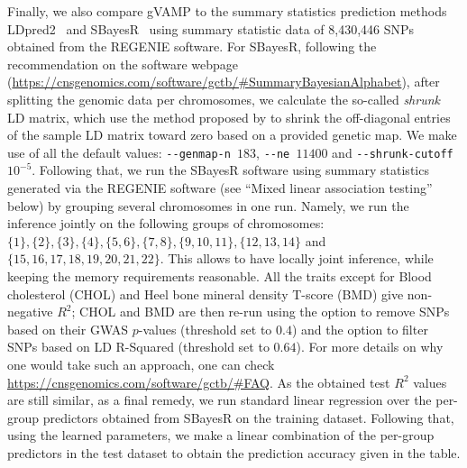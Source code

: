 Finally, we also compare gVAMP to the summary statistics prediction methods LDpred2~\cite{ldpred} and SBayesR~\cite{sbayesr} using summary statistic data of 8,430,446 SNPs obtained from the REGENIE software. For SBayesR, following the recommendation on the software webpage (\url{https://cnsgenomics.com/software/gctb/#SummaryBayesianAlphabet}), after splitting the genomic data per chromosomes, we calculate the so-called \textit{shrunk} LD matrix, which use the method proposed by \cite{Wen_Stephens} to shrink the off-diagonal entries of the sample LD matrix toward zero based on a provided genetic map. We make use of all the default values: \texttt{-{}-genmap-n $183$}, \texttt{-{}-ne $11400$} and \texttt{-{}-shrunk-cutoff $10^{-5}$}. Following that, we run the SBayesR software using summary statistics generated via the REGENIE software (see ``Mixed linear association testing'' below) by grouping several chromosomes in one run. Namely, we run the inference jointly on the following groups of chromosomes: $\{1\}, \{2\}, \{3\}, \{4\}, \allowbreak \{5,6\}, \allowbreak \{7,8\}, \allowbreak \{9, 10, 11\}, \allowbreak \{12, 13, 14\}$ and $\{15, 16, 17, 18, 19, 20, 21, 22\}$. This allows to have locally joint inference, while keeping the memory requirements reasonable. All the traits except for Blood cholesterol (CHOL) and Heel bone mineral density T-score (BMD) give non-negative $R^2$; CHOL and BMD are then re-run using the option to remove SNPs based on their GWAS $p$-values (threshold set to $0.4$) and the option to filter SNPs based on LD R-Squared (threshold set to $0.64$). For more details on why one would take such an approach, one can check \url{https://cnsgenomics.com/software/gctb/#FAQ}. As the obtained test $R^2$ values are still similar, as a final remedy, we run standard linear regression over the per-group predictors obtained from SBayesR on the training dataset. Following that, using the learned parameters, we make a linear combination of the per-group predictors in the test dataset to obtain the prediction accuracy given in the table. 

